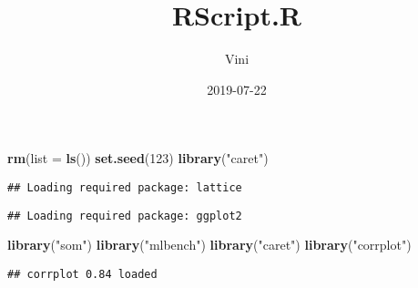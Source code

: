 \documentclass[]{article}
\title{RScript.R}
\author{Vini}
\date{2019-07-22}
\newenvironment{Shaded}{\begin{snugshade}}{\end{snugshade}}
\newcommand{\KeywordTok}[1]{\textcolor[rgb]{0.13,0.29,0.53}{\textbf{#1}}}
\newcommand{\DataTypeTok}[1]{\textcolor[rgb]{0.13,0.29,0.53}{#1}}
\newcommand{\DecValTok}[1]{\textcolor[rgb]{0.00,0.00,0.81}{#1}}
\newcommand{\StringTok}[1]{\textcolor[rgb]{0.31,0.60,0.02}{#1}}
\newcommand{\NormalTok}[1]{#1}
\begin{document}
\maketitle

\begin{Shaded}
\begin{Highlighting}[]
\KeywordTok{rm}\NormalTok{(}\DataTypeTok{list =} \KeywordTok{ls}\NormalTok{())}
\KeywordTok{set.seed}\NormalTok{(}\DecValTok{123}\NormalTok{)}
\KeywordTok{library}\NormalTok{(}\StringTok{"caret"}\NormalTok{)}
\end{Highlighting}
\end{Shaded}

\begin{verbatim}
## Loading required package: lattice
\end{verbatim}

\begin{verbatim}
## Loading required package: ggplot2
\end{verbatim}

\begin{Shaded}
\begin{Highlighting}[]
\KeywordTok{library}\NormalTok{(}\StringTok{"som"}\NormalTok{)}
\KeywordTok{library}\NormalTok{(}\StringTok{"mlbench"}\NormalTok{)}
\KeywordTok{library}\NormalTok{(}\StringTok{"caret"}\NormalTok{)}
\KeywordTok{library}\NormalTok{(}\StringTok{"corrplot"}\NormalTok{)}
\end{Highlighting}
\end{Shaded}

\begin{verbatim}
## corrplot 0.84 loaded
\end{verbatim}
\end{document}

